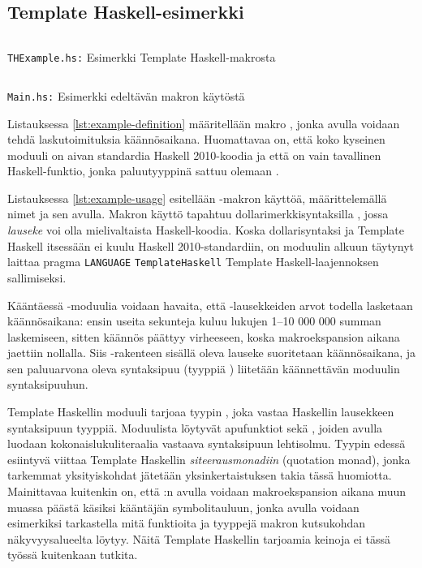 \subsection{Template Haskell-esimerkki}

\begin{listing}[H]
    \inputminted{haskell}{codes/compile-time-eval-example/THExample.hs}
    \label{lst:example-definition}
    \caption{\texttt{THExample.hs:} Esimerkki Template Haskell-makrosta}
\end{listing}

\begin{listing}[H]
    \inputminted{haskell}{codes/compile-time-eval-example/Main.hs}
    \label{lst:example-usage}
    \caption{\texttt{Main.hs:} Esimerkki edeltävän makron käytöstä}
\end{listing}

Listauksessa \ref{lst:example-definition} määritellään makro ,
jonka avulla voidaan tehdä laskutoimituksia käännösaikana.
Huomattavaa on, että koko kyseinen moduuli on aivan standardia Haskell 2010-koodia
ja että  on vain tavallinen Haskell-funktio,
jonka paluutyyppinä sattuu olemaan .

Listauksessa \ref{lst:example-usage} esitellään -makron käyttöä,
mää\-rit\-tele\-mäl\-lä nimet  ja  sen avulla.
Makron käyttö tapahtuu dollarimerkkisyntaksilla ,
jossa \emph{lauseke} voi olla mielivaltaista Haskell-koodia.
Koska dollarisyntaksi ja Template Haskell itsessään ei kuulu Haskell 2010-standardiin,
on moduulin alkuun täytynyt laittaa pragma \texttt{LANGUAGE} \texttt{TemplateHaskell}
Template Haskell-laajennoksen sallimiseksi.

Kääntäessä -moduulia voidaan havaita,
että \Haskell{\$()}-lausekkeiden arvot todella lasketaan käännösaikana:
ensin useita sekunteja kuluu lukujen 1--10 000 000 summan laskemiseen,
sitten käännös päättyy virheeseen,
koska makroekspansion aikana jaettiin nollalla.
Siis \Haskell{\$()}-rakenteen sisällä oleva lauseke suoritetaan käännösaikana,
ja sen paluuarvona oleva syntaksipuu (tyyppiä ) liitetään käännettävän moduulin
syntaksipuuhun.

Template Haskellin moduuli  tarjoaa tyypin ,
joka vastaa Haskellin lausekkeen syntaksipuun tyyppiä.
Moduulista  löytyvät apufunktiot 
sekä ,
joiden avulla luodaan kokonaislukuliteraalia vastaava syntaksipuun lehtisolmu.
Tyypin  edessä esiintyvä  viittaa Template Haskellin
\emph{siteerausmonadiin} (quotation monad),
jonka tarkemmat yksityiskohdat jätetään yksinkertaistuksen takia tässä huomiotta.
Mainittavaa kuitenkin on,
että :n avulla voidaan makroekspansion aikana muun muassa päästä käsiksi kääntäjän symbolitauluun,
jonka avulla voidaan esimerkiksi tarkastella mitä funktioita ja tyyppejä makron kutsukohdan näkyvyysalueelta
löytyy. Näitä Template Haskellin tarjoamia keinoja ei tässä työssä kuitenkaan tutkita.

